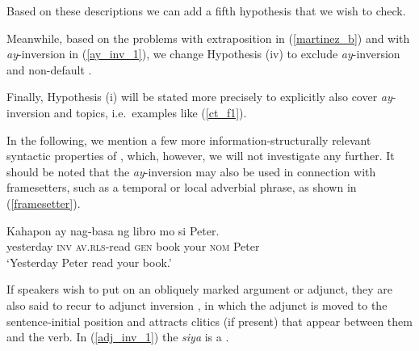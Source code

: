 \documentclass[output=paper,
,modfonts
,nonflat]{langsci/langscibook}
\begin{document}
\noindent Based on these descriptions we can add a fifth hypothesis that we wish to check.


\noindent Meanwhile, based on the problems with extraposition in (\ref{martinez_b}) and with \textit{ay}-in\-ver\-sion in (\ref{ay_inv_1}), we change Hypothesis (iv) to exclude \textit{ay}-inversion and non-default .


\noindent Finally, Hypothesis (i) will be stated more precisely to explicitly also cover \textit{ay}-inversion and  topics, i.e.\ examples like (\ref{ct_f1}).


\noindent In the following, we mention a few more information-structurally relevant syntactic properties of , which, however, we will not investigate any further. It should be noted that the \textit{ay}-inversion may also be used in connection with framesetters, such as a temporal or local adverbial phrase, as shown in (\ref{framesetter}).

\begin{exe}
\ex\label{framesetter}
\gll Kahapon    ay    nag‐basa    ng libro mo    si Peter.\\
     yesterday    \textsc{inv}    \textsc{av.rls}‐read    \textsc{gen} book your  \textsc{nom} Peter\\
\glt `Yesterday Peter read your book.'
\end{exe}

\noindent If  speakers wish to put  on an obliquely marked argument or adjunct, they are also said to recur to adjunct inversion \citep{kropa93}, in which the adjunct is moved to the sentence‐initial position and attracts clitics (if present) that appear between them and the verb. In (\ref{adj_inv_1}) the  \textit{siya} is a .
\end{document}
